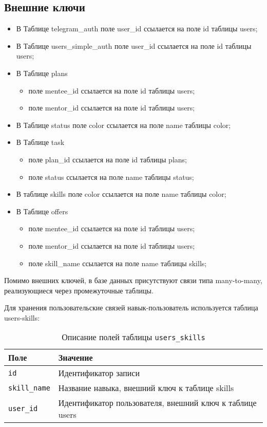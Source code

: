 \subsection{Внешние ключи}
\begin{itemize}
\item В Таблице telegram\_auth поле user\_id ссылается на поле id таблицы users;
\item В Таблице users\_simple\_auth поле user\_id ссылается на поле id таблицы users;
\item В Таблице plans 
	\begin{itemize}
		\item поле mentee\_id ссылается на поле id таблицы users;
		\item поле mentor\_id ссылается на поле id таблицы users;
	\end{itemize}
\item В Таблице status поле color ссылается на поле name таблицы color;
\item В Таблице task 
	\begin{itemize}
		\item поле plan\_id ссылается на поле id таблицы plans;
		\item поле status ссылается на поле name таблицы status;
	\end{itemize}
\item В таблице skills поле color ссылается на поле name таблицы color;
\item В Таблице offers 
	\begin{itemize}
		\item поле mentee\_id ссылается на поле id таблицы users;
		\item поле mentor\_id ссылается на поле id таблицы users;
		\item поле skill\_name ссылается на поле name таблицы skills;
	\end{itemize}
\end{itemize}
Помимо внешних ключей, в базе данных присутствуют связи типа many-to-many, реализующиеся через промежуточные таблицы.  

Для хранения пользовательские связей навык-пользователь используется таблица users-skills:
\begin{table}[!ht]
    \caption{Описание полей таблицы \texttt{users\_skills}}
    \label{tbl:users-skills}
    \begin{center}
        \begin{tabular}{|p{}p{}|}
            \hline
            \textbf{Поле} & \textbf{Значение} \\\hline
            \texttt{id} & Идентификатор записи \\\hline
            \texttt{skill\_name} & Название навыка, внешний ключ к таблице skills \\\hline
            \texttt{user\_id} & Идентификатор пользователя, внешний ключ к таблице users \\\hline
        \end{tabular}
    \end{center}
\end{table}

